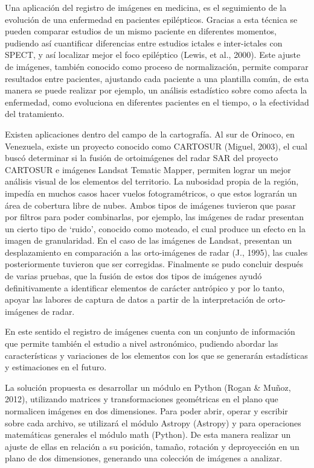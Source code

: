 Una aplicación del registro de imágenes en medicina, es el seguimiento
de la evolución de una enfermedad en pacientes epilépticos. Gracias a
esta técnica se pueden comparar estudios de un mismo paciente en
diferentes momentos, pudiendo así cuantificar diferencias entre
estudios ictales e inter-ictales con SPECT, y así localizar mejor el
foco epiléptico (Lewis, et al., 2000). Este ajuste de imágenes,
también conocido como proceso de normalización, permite comparar
resultados entre pacientes, ajustando cada paciente a una plantilla
común, de esta manera se puede realizar por ejemplo, un análisis
estadístico sobre como afecta la enfermedad, como evoluciona en
diferentes pacientes en el tiempo, o la efectividad del tratamiento.

Existen aplicaciones dentro del campo de la cartografía. Al sur de
Orinoco, en Venezuela, existe un proyecto conocido como CARTOSUR
(Miguel, 2003), el cual buscó determinar si la fusión de ortoimágenes
del radar SAR del proyecto CARTOSUR e imágenes Landsat Tematic Mapper,
permiten lograr un mejor análisis visual de los elementos del
territorio. La nubosidad propia de la región, impedía en muchos casos
hacer vuelos fotogramétricos, o que estos lograrán un área de
cobertura libre de nubes. Ambos tipos de imágenes tuvieron que pasar
por filtros para poder combinarlas, por ejemplo, las imágenes de radar
presentan un cierto tipo de ‘ruido’, conocido como moteado, el cual
produce un efecto en la imagen de granularidad. En el caso de las
imágenes de Landsat, presentan un desplazamiento en comparación a las
orto-imágenes de radar (J., 1995), las cuales posteriormente tuvieron
que ser corregidas. Finalmente se pudo concluir después de varias
pruebas, que la fusión de estos dos tipos de imágenes ayudó
definitivamente a identificar elementos de carácter antrópico y por lo
tanto, apoyar las labores de captura de datos a partir de la
interpretación de orto-imágenes de radar.

En este sentido el registro de imágenes cuenta con un conjunto de
información que permite también el estudio a nivel astronómico,
pudiendo abordar las características y variaciones de los elementos
con los que se generarán estadísticas y estimaciones en el futuro.

La solución propuesta es desarrollar un módulo en Python (Rogan \&
Muñoz, 2012), utilizando matrices y transformaciones geométricas en el
plano que normalicen imágenes en dos dimensiones. Para poder abrir,
operar y escribir sobre cada archivo, se utilizará el módulo Astropy
(Astropy) y para operaciones matemáticas generales el módulo math
(Python). De esta manera realizar un ajuste de ellas en relación a su
posición, tamaño, rotación y deproyección en un plano de dos
dimensiones, generando una colección de imágenes a analizar.